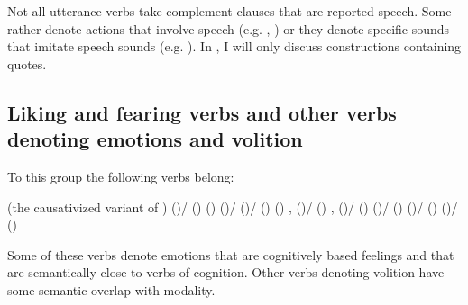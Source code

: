 Not all utterance verbs take complement clauses that are reported speech. Some rather denote actions that involve speech (e.g. , ) or they denote specific sounds that imitate speech sounds (e.g.  ). In , I will only discuss constructions containing quotes.



\subsection{Liking and fearing verbs and other verbs denoting emotions and volition}
\label{ssec:Liking and fearing verbs and other verbs denoting emotions and volition}

To this group the following verbs belong: 
%
\begin{exe}
	\ex	\label{ex:verbs of liking of fearing}
	\begin{xlist}
		\ex	{}  
		\ex	{}  (the causativized variant of )
		\ex	{} ()\slash{} () 
		\ex	{} () 
		\ex	{} ()\slash{} 
		\ex	{} ()\slash{} () 
		\ex	{} () ,  
		\ex	{} ()\slash{} () ,  
		\ex	{} ()\slash{} () 
		\ex	{} ()\slash  {} () 
		\ex	{} ()\slash{} () 
		\ex	{} ()\slash{} () 
	\end{xlist}
\end{exe}

Some of these verbs denote emotions that are cognitively based feelings and that are semantically close to verbs of cognition. Other verbs denoting volition have some semantic overlap with modality.



